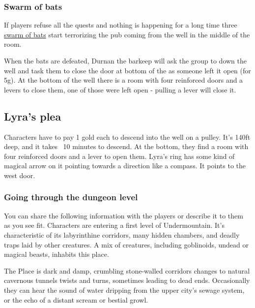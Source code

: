 \documentclass[10pt,onecolumn,twoside,openany,bg=full,layout=true]{dndbook}
\begin{document}
\subsubsection{Swarm of bats}
If players refuse all the quests and nothing is happening for a long time three
\href{https://www.dndbeyond.com/monsters/17028-swarm-of-bats}{swarm of bats} start terrorizing the pub coming from the well in the middle of the room.

When the bats are defeated, Durnan the barkeep will ask the group to down the well and task them to close the door at bottom of the as someone left it open (for 5g).
At the bottom of the well there is a room with four reinforced doors and a levers to close them, one of those were left open - pulling a lever will close it.
\vfill
\newpage

\subsection{Lyra's plea}\label{subsec:lyras-plea}
Characters have to pay 1 gold each to descend into the well on a pulley.
It's 140ft deep, and it takes ~10 minutes to descend.
At the bottom, they find a room with four reinforced doors and a lever to open them.
Lyra's ring has some kind of magical arrow on it pointing towards a direction like a compass.
It points to the west door.
\subsubsection{Going through the dungeon level}
You can share the following information with the players or describe it to them as you see fit.
Characters are entering a first level of Undermountain.
It's characteristic of its labyrinthine corridors, many hidden chambers, and deadly traps laid by other creatures.
A mix of creatures, including goblinoids, undead or magical beasts, inhabits this place.
\begin{DndReadAloud}
The Place is dark and damp, crumbling stone-walled corridors changes to natural cavernous tunnels twists and turns, sometimes leading to dead ends.
Occasionally they can hear the sound of water dripping from the upper city's sewage system, or the echo of a distant scream or bestial growl.
\end{DndReadAloud}
\end{document}
